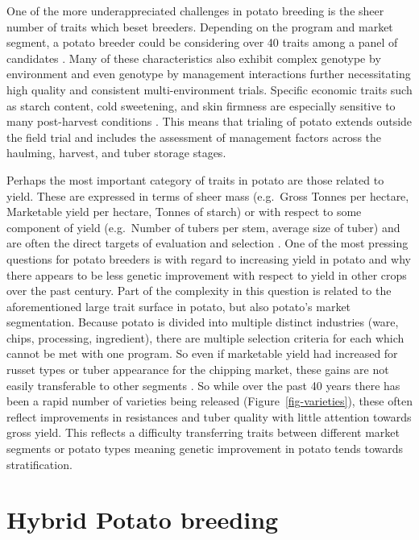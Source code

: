 \documentclass[
]{article}
\begin{document}
One of the more underappreciated challenges in potato breeding is the
sheer number of traits which beset breeders. Depending on the program
and market segment, a potato breeder could be considering over 40 traits
among a panel of candidates \autocite{Gebhardt2013}. Many of these
characteristics also exhibit complex genotype by environment and even
genotype by management interactions further necessitating high quality
and consistent multi-environment trials. Specific economic traits such
as starch content, cold sweetening, and skin firmness are especially
sensitive to many post-harvest conditions \autocite{Jansky2006}. This
means that trialing of potato extends outside the field trial and
includes the assessment of management factors across the haulming,
harvest, and tuber storage stages.

Perhaps the most important category of traits in potato are those
related to yield. These are expressed in terms of sheer mass (e.g.~Gross
Tonnes per hectare, Marketable yield per hectare, Tonnes of starch) or
with respect to some component of yield (e.g.~Number of tubers per stem,
average size of tuber) and are often the direct targets of evaluation
and selection \autocite{Tai1976,Lemaga1990,Haynes2001}. One of the most
pressing questions for potato breeders is with regard to increasing
yield in potato and why there appears to be less genetic improvement
with respect to yield in other crops over the past century. Part of the
complexity in this question is related to the aforementioned large trait
surface in potato, but also potato's market segmentation. Because potato
is divided into multiple distinct industries (ware, chips, processing,
ingredient), there are multiple selection criteria for each which cannot
be met with one program. So even if marketable yield had increased for
russet types or tuber appearance for the chipping market, these gains
are not easily transferable to other segments
\autocite{Douches1996,Hirsch2013}. So while over the past 40 years there
has been a rapid number of varieties being released
(Figure~\ref{fig-varieties}), these often reflect improvements in
resistances and tuber quality with little attention towards gross yield.
This reflects a difficulty transferring traits between different market
segments or potato types meaning genetic improvement in potato tends
towards stratification.

\section{Hybrid Potato breeding}\label{hybrid-potato-breeding}
\end{document}
